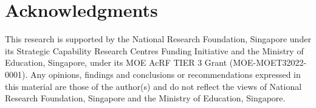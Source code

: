 \documentclass[11pt]{article}
\begin{document}
\section{Acknowledgments}

\small{This research is supported by the National Research Foundation, Singapore under its Strategic Capability Research Centres Funding Initiative and the Ministry of Education, Singapore, under its MOE AcRF TIER 3 Grant (MOE-MOET32022-0001).
Any opinions, findings and conclusions or recommendations expressed in this material are those of the author(s) and do not reflect the views of National Research Foundation, Singapore and the Ministry of Education, Singapore.}
\end{document}
